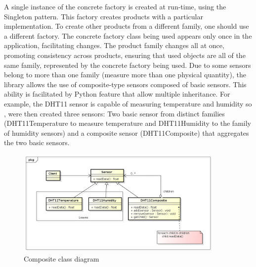\documentclass{acm_proc_article-sp}
\begin{document}
A single instance of the concrete factory is created at run-time, using the Singleton pattern. This factory creates products with a particular implementation. To create other products from a different family, one should use a different factory. The concrete factory class being used appears only once in the application, facilitating changes. The product family changes all at once, promoting consistency across products, ensuring that used objects are all of the same family, represented by the concrete factory being used.
\newline
\newline
Due to some sensors belong to more than one family (measure more than one physical quantity), the library allows the use of composite-type sensors composed of basic sensors. This ability is facilitated by Python feature that allow multiple inheritance. For example, the DHT11 sensor is capable of measuring temperature and humidity so , were then created three sensors: Two basic sensor from distinct families (DHT11Temperature to measure temperature and DHT11Humidity to the family of humidity sensors) and a composite sensor (DHT11Composite) that aggregates the two basic sensors.
\begin{figure}[h]
    \includegraphics[width=0.9\textwidth,natwidth=610,natheight=642]{pictures/composite.png}
    \caption{Composite class diagram}
    \label{fig:composite}
\end{figure}
\end{document}
